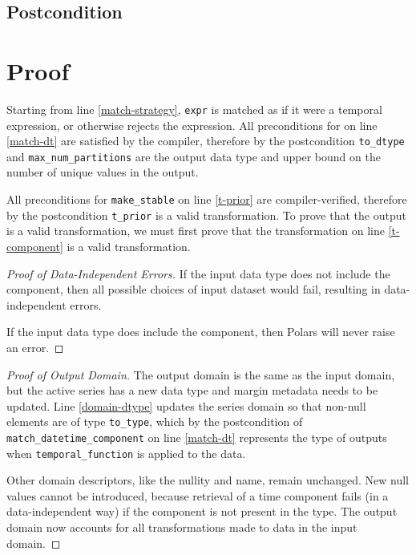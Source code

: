 \documentclass{article}
\begin{document}
\subsection*{Postcondition}
\begin{sloppypar}
\end{sloppypar}

\section{Proof}

Starting from line \ref{match-strategy}, 
\texttt{expr} is matched as if it were a temporal expression, or otherwise rejects the expression.
All preconditions for  
on line \ref{match-dt} are satisfied by the compiler, 
therefore by the postcondition \texttt{to\_dtype} and \texttt{max\_num\_partitions} 
are the output data type and upper bound on the number of unique values in the output.

All preconditions for \texttt{make\_stable} on line \ref{t-prior} are compiler-verified,
therefore by the postcondition \texttt{t\_prior} is a valid transformation.
To prove that the output is a valid transformation, 
we must first prove that the transformation on line \ref{t-component} is a valid transformation.

\begin{proof}[Proof of Data-Independent Errors]
    If the input data type does not include the component, 
    then all possible choices of input dataset would fail,
    resulting in data-independent errors.

    If the input data type does include the component,
    then Polars will never raise an error.
\end{proof}

\begin{proof}[Proof of Output Domain]
    The output domain is the same as the input domain, 
    but the active series has a new data type and margin metadata needs to be updated.
    Line \ref{domain-dtype} updates the series domain so that non-null elements are of type \texttt{to\_type},
    which by the postcondition of \texttt{match\_datetime\_component} on line \ref{match-dt}
    represents the type of outputs when \texttt{temporal\_function} is applied to the data.

    Other domain descriptors, like the nullity and name, remain unchanged.
    New null values cannot be introduced, 
    because retrieval of a time component fails (in a data-independent way) if the component is not present in the type.
    The output domain now accounts for all transformations made to data in the input domain.
\end{proof}
\end{document}
